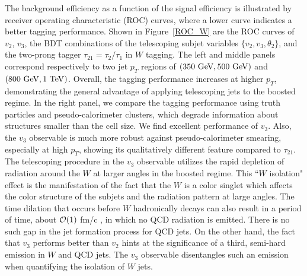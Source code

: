 \documentclass[aps,prl,floatfix,preprintnumbers,twocolumn,groupedaddress,nofootinbib]{revtex4-1}
\begin{document}
The background efficiency as a function of the signal efficiency is illustrated by receiver operating characteristic (ROC) curves, where a lower curve indicates a better tagging performance. Shown in Figure~\ref{ROC_W} are the ROC curves of $v_2$, $v_3$, the BDT combinations of the telescoping subjet variables $\{v_2, v_3, \theta_2\}$, and the two-prong tagger $\tau_{21}=\tau_{2}/\tau_{1}$ in $W$ tagging. The left and middle panels correspond respectively to two jet $p_T$ regions of $(350~{\rm GeV}, 500~{\rm GeV})$ and $(800~{\rm GeV}, 1~{\rm TeV})$. Overall, the tagging performance increases at higher $p_T$, demonstrating the general advantage of applying telescoping jets to the boosted regime. In the right panel, we compare the tagging performance using truth particles and pseudo-calorimeter clusters, which degrade information about structures smaller than the cell size. We find excellent performance of $v_3$. Also, the $v_3$ observable is much more robust against pseudo-calorimeter smearing, especially at high $p_T$, showing its qualitatively different feature compared to $\tau_{21}$. The telescoping procedure in the $v_3$ observable utilizes the rapid depletion of radiation around the $W$ at larger angles in the boosted regime. This ``$W$ isolation" effect is the manifestation of the fact that the $W$ is a color singlet which affects the color structure of the subjets and the radiation pattern at large angles. The time dilation that occurs before $W$ hadronically decays can also result in a period of time, about ${\cal O}(1)$ fm/c \cite{Apolinario:2017sob}, in which no QCD radiation is emitted. There is no such gap in the jet formation process for QCD jets. On the other hand, the fact that $v_3$ performs better than $v_2$ hints at the significance of a third, semi-hard emission in $W$ and QCD jets. The $v_3$ observable disentangles such an emission when quantifying the isolation of $W$ jets.
\end{document}
